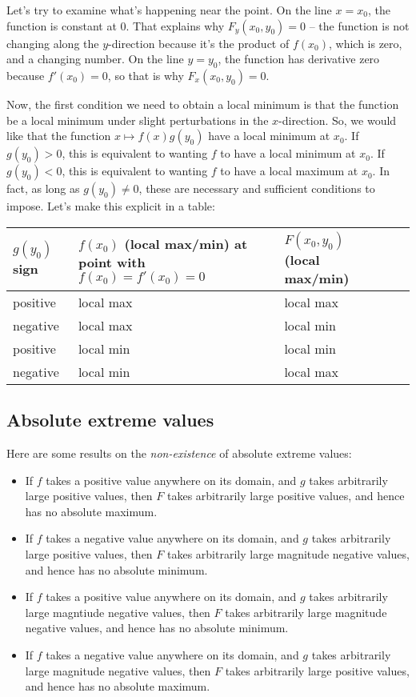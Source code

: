 \documentclass[10pt]{amsart}
\begin{document}
Let's try to examine what's happening near the point. On the line $x =
x_0$, the function is constant at $0$. That explains why $F_y(x_0,y_0)
= 0$ -- the function is not changing along the $y$-direction because
it's the product of $f(x_0)$, which is zero, and a changing number. On
the line $y = y_0$, the function has derivative zero because $f'(x_0)
= 0$, so that is why $F_x(x_0,y_0) = 0$.

Now, the first condition we need to obtain a local minimum is that the
function be a local minimum under slight perturbations in the
$x$-direction. So, we would like that the function $x \mapsto
f(x)g(y_0)$ have a local minimum at $x_0$. If $g(y_0) > 0$, this is
equivalent to wanting $f$ to have a local minimum at $x_0$. If $g(y_0)
< 0$, this is equivalent to wanting $f$ to have a local maximum at
$x_0$. In fact, as long as $g(y_0) \ne 0$, these are necessary and
sufficient conditions to impose. Let's make this explicit in a table:

\begin{tabular}{|l|l|l|l|l|}
  \hline
  $g(y_0)$ sign & $f(x_0)$ (local max/min) at point with $f(x_0) = f'(x_0) = 0$ & $F(x_0,y_0)$ (local max/min) \\\hline
  positive & local max & local max\\\hline
  negative & local max & local min \\\hline
  positive & local min & local min \\\hline
  negative & local min & local max \\\hline
\end{tabular}


\subsection{Absolute extreme values}

Here are some results on the {\em non-existence} of absolute extreme
values:

\begin{itemize}
\item If $f$ takes a positive value anywhere on its domain, and $g$
  takes arbitrarily large positive values, then $F$ takes arbitrarily
  large positive values, and hence has no absolute maximum. 
\item If $f$ takes a negative value anywhere on its domain, and $g$
  takes arbitrarily large positive values, then $F$ takes arbitrarily
  large magnitude negative values, and hence has no absolute
  minimum. 
\item If $f$ takes a positive value anywhere on its domain, and $g$
  takes arbitrarily large magntiude negative values, then $F$ takes
  arbitrarily large magnitude negative values, and hence has no
  absolute minimum.
\item If $f$ takes a negative value anywhere on its domain, and $g$
  takes arbitrarily large magnitude negative values, then $F$ takes
  arbitrarily large positive values, and hence has no absolute
  maximum.
\end{itemize}
\end{document}
